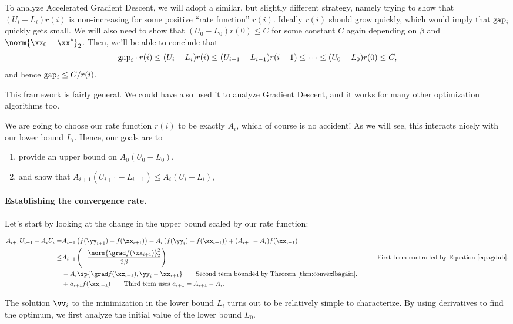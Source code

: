 To analyze Accelerated Gradient Descent, we will adopt a similar, but
slightly different strategy, namely trying to show that $(U_i - L_i) r(i)$
is non-increasing for some positive ``rate function'' $r(i)$. Ideally $r(i)$ should
grow quickly, which would imply that $\text{gap}_i$ quickly gets small.
We will also need to show that $(U_0 - L_0) r(0) \leq C$ for some constant
$C$ again depending on $\beta$ and $\norm{\xx_0 - \xx^*}_2$.
%
Then, we'll be able to conclude that
\[
\text{gap}_i \cdot r(i) \leq (U_i - L_i) r(i) \leq (U_{i-1} - L_{i-1}) r(i-1) \leq
\cdots \leq (U_0 - L_0) r(0) \leq C,
\]
and hence $\text{gap}_i \leq C/r(i)$.

This framework is fairly general. We could have also used it to
analyze Gradient Descent, and it works for many other optimization
algorithms too.

We are going to choose our rate function $r(i)$ to be exactly $A_i$,
which of course is no accident!
As we will see, this interacts nicely with our lower
bound $L_i$.
Hence, our goals are to
\begin{enumerate}
\item provide an upper bound on $A_0 (U_0 - L_0)$,
\item and show that $A_{i+1} (U_{i+1} - L_{i+1})  \leq A_{i} (U_{i} - L_{i}) $,
\end{enumerate}

\paragraph{Establishing the convergence rate.}
Let's start by looking at the change in the upper bound scaled by our
rate function:

\begin{align}
 \label{eq:ubgap}
 A_{i+1}U_{i+1} - A_i U_i
 =&
 A_{i+1}\left( f(\yy_{i+1}) - f(\xx_{i+1}) \right)
 -
 A_{i}\left( f(\yy_{i}) - f(\xx_{i+1}) \right)
 +
 (A_{i+1}-A_{i}) f(\xx_{i+1})
\\
\leq &
    A_{i+1}\left(
    - \frac{\norm{\grad  f(\xx_{i+1})}_2^2}{2\beta}
      \right)
      & \tag*{First term controlled by Equation~\eqref{eq:agdub}.}
 \\
 &-
    A_{i}
   \ip{\grad f(\xx_{i+1}), \yy_{i} - \xx_{i+1}  }
   \tag*{Second term bounded by Theorem~\ref{thm:convexlbagain}.}
 \\
  &+ a_{i+1} f(\xx_{i+1})
    \tag*{Third term uses $a_{i+1} = A_{i+1}-A_{i}$.}
\end{align}

The solution $\vv_i$ to the minimization in the lower bound $L_i$
turns out to be relatively simple to characterize.
By using derivatives to find the optimum, we first analyze the initial
value of the lower bound $L_0$.

